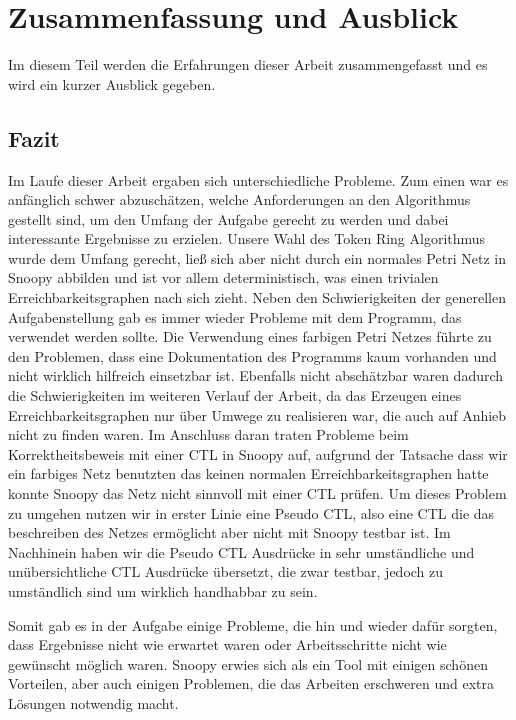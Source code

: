 \section{Zusammenfassung und Ausblick} 
Im diesem Teil werden die Erfahrungen dieser Arbeit zusammengefasst und es wird ein kurzer Ausblick gegeben.

\subsection{Fazit}
Im Laufe dieser Arbeit ergaben sich unterschiedliche Probleme. Zum einen war es anfänglich schwer abzuschätzen, welche Anforderungen an den Algorithmus gestellt sind, um den Umfang der Aufgabe gerecht zu werden und dabei interessante Ergebnisse zu erzielen. Unsere Wahl des Token Ring Algorithmus wurde dem Umfang gerecht, ließ sich aber nicht durch ein normales Petri Netz in Snoopy abbilden und ist vor allem deterministisch, was einen trivialen Erreichbarkeitsgraphen nach sich zieht. Neben den Schwierigkeiten der generellen Aufgabenstellung gab es immer wieder Probleme mit dem Programm, das verwendet werden sollte. Die Verwendung eines farbigen Petri Netzes führte zu den Problemen, dass eine Dokumentation des Programms kaum vorhanden und nicht wirklich hilfreich einsetzbar ist. Ebenfalls nicht abschätzbar waren dadurch die Schwierigkeiten im weiteren Verlauf der Arbeit, da das Erzeugen eines Erreichbarkeitsgraphen nur über Umwege zu realisieren war, die auch auf Anhieb nicht zu finden waren. Im Anschluss daran traten Probleme beim Korrektheitsbeweis mit einer CTL in Snoopy auf, aufgrund der Tatsache dass wir ein farbiges Netz benutzten das keinen normalen Erreichbarkeitsgraphen hatte konnte Snoopy das Netz nicht sinnvoll mit einer CTL prüfen. Um dieses Problem zu umgehen nutzen wir in erster Linie eine Pseudo CTL, also eine CTL die das beschreiben des Netzes ermöglicht aber nicht mit Snoopy testbar ist. Im Nachhinein haben wir die Pseudo CTL Ausdrücke in sehr umständliche und unübersichtliche CTL Ausdrücke übersetzt, die zwar testbar, jedoch zu umständlich sind um wirklich handhabbar zu sein.

Somit gab es in der Aufgabe einige Probleme, die hin und wieder dafür sorgten, dass Ergebnisse nicht wie erwartet waren oder Arbeitsschritte nicht wie gewünscht möglich waren. Snoopy erwies sich als ein Tool mit einigen schönen Vorteilen, aber auch einigen Problemen, die das Arbeiten erschweren und extra Lösungen notwendig macht.

